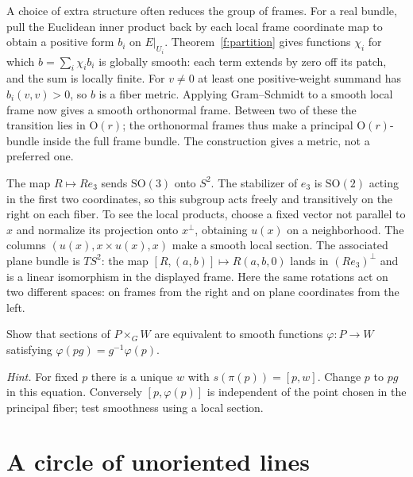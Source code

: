 A choice of extra structure often reduces the group of frames. For a real bundle, pull the Euclidean inner product back by each local frame coordinate map to obtain a positive form $b_i$ on $E|_{U_i}$. Theorem~\ref{f:partition} gives functions $\chi_i$ for which $b=\sum_i\chi_i b_i$ is globally smooth: each term extends by zero off its patch, and the sum is locally finite. For $v\ne0$ at least one positive-weight summand has $b_i(v,v)>0$, so $b$ is a fiber metric. Applying Gram--Schmidt to a smooth local frame now gives a smooth orthonormal frame. Between two of these the transition lies in $\mathrm O(r)$; the orthonormal frames thus make a principal $\mathrm O(r)$-bundle inside the full frame bundle. The construction gives a metric, not a preferred one.

\begin{example}
The map $R\mapsto R e_3$ sends $\mathrm{SO}(3)$ onto $S^2$. The stabilizer of $e_3$ is $\mathrm{SO}(2)$ acting in the first two coordinates, so this subgroup acts freely and transitively on the right on each fiber. To see the local products, choose a fixed vector not parallel to $x$ and normalize its projection onto $x^\perp$, obtaining $u(x)$ on a neighborhood. The columns $(u(x),x\times u(x),x)$ make a smooth local section. The associated plane bundle is $TS^2$: the map $[R,(a,b)]\mapsto R(a,b,0)$ lands in $(R e_3)^\perp$ and is a linear isomorphism in the displayed frame. Here the same rotations act on two different spaces: on frames from the right and on plane coordinates from the left.
\end{example}

\begin{exercise}
Show that sections of $P\times_G W$ are equivalent to smooth functions $\varphi:P\to W$ satisfying $\varphi(p g)=g^{-1}\varphi(p)$.

\emph{Hint.} For fixed $p$ there is a unique $w$ with $s(\pi(p))=[p,w]$. Change $p$ to $p g$ in this equation. Conversely $[p,\varphi(p)]$ is independent of the point chosen in the principal fiber; test smoothness using a local section.
\end{exercise}

\section{A circle of unoriented lines}

